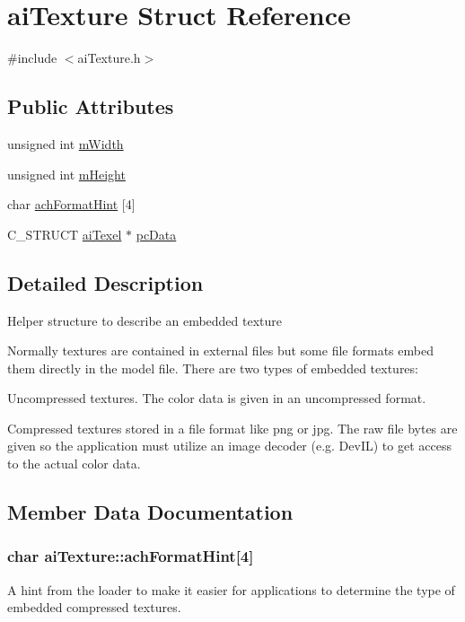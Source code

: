 \hypertarget{structai_texture}{\section{ai\-Texture Struct Reference}
\label{structai_texture}
}


{\ttfamily \#include $<$ai\-Texture.\-h$>$}

\subsection*{Public Attributes}
\begin{DoxyCompactItemize}
\item 
unsigned int \hyperlink{structai_texture_aaa3ad8cfe44fdc4dea2db91977d92234}{m\-Width}
\item 
unsigned int \hyperlink{structai_texture_ac1e2fa6f1f646e9c55e3985d4418a752}{m\-Height}
\item 
char \hyperlink{structai_texture_aa9f44996acf3b301bfeb4e5348311540}{ach\-Format\-Hint} \mbox{[}4\mbox{]}
\item 
C\-\_\-\-S\-T\-R\-U\-C\-T \hyperlink{structai_texel}{ai\-Texel} $\ast$ \hyperlink{structai_texture_aeb07528748b6e49d2d81c60006024f9a}{pc\-Data}
\end{DoxyCompactItemize}


\subsection{Detailed Description}
Helper structure to describe an embedded texture

Normally textures are contained in external files but some file formats embed them directly in the model file. There are two types of embedded textures\-:
\begin{DoxyEnumerate}
\item Uncompressed textures. The color data is given in an uncompressed format.
\item Compressed textures stored in a file format like png or jpg. The raw file bytes are given so the application must utilize an image decoder (e.\-g. Dev\-I\-L) to get access to the actual color data. 
\end{DoxyEnumerate}

\subsection{Member Data Documentation}
\hypertarget{structai_texture_aa9f44996acf3b301bfeb4e5348311540}{
\subsubsection[{ach\-Format\-Hint}]{\setlength{\rightskip}{0pt plus 5cm}char ai\-Texture\-::ach\-Format\-Hint\mbox{[}4\mbox{]}}}\label{structai_texture_aa9f44996acf3b301bfeb4e5348311540}
A hint from the loader to make it easier for applications to determine the type of embedded compressed textures.

